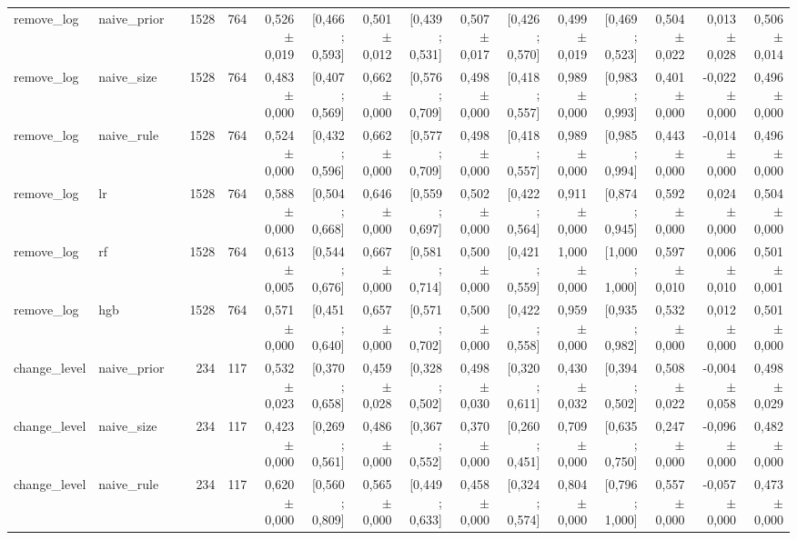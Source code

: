 \begin{table}[htbp]
{\begin{tabular}{llrrrrrrrrrrrrrr}
remove\_log & naive\_prior &  & 1528 & 764 & 0,526 $\pm$ 0,019 & [0,466 ; 0,593] & 0,501 $\pm$ 0,012 & [0,439 ; 0,531] & 0,507 $\pm$ 0,017 & [0,426 ; 0,570] & 0,499 $\pm$ 0,019 & [0,469 ; 0,523] & 0,504 $\pm$ 0,022 & 0,013 $\pm$ 0,028 & 0,506 $\pm$ 0,014 \\
remove\_log & naive\_size &  & 1528 & 764 & 0,483 $\pm$ 0,000 & [0,407 ; 0,569] & 0,662 $\pm$ 0,000 & [0,576 ; 0,709] & 0,498 $\pm$ 0,000 & [0,418 ; 0,557] & 0,989 $\pm$ 0,000 & [0,983 ; 0,993] & 0,401 $\pm$ 0,000 & -0,022 $\pm$ 0,000 & 0,496 $\pm$ 0,000 \\
remove\_log & naive\_rule &  & 1528 & 764 & 0,524 $\pm$ 0,000 & [0,432 ; 0,596] & 0,662 $\pm$ 0,000 & [0,577 ; 0,709] & 0,498 $\pm$ 0,000 & [0,418 ; 0,557] & 0,989 $\pm$ 0,000 & [0,985 ; 0,994] & 0,443 $\pm$ 0,000 & -0,014 $\pm$ 0,000 & 0,496 $\pm$ 0,000 \\
remove\_log & lr &  & 1528 & 764 & 0,588 $\pm$ 0,000 & [0,504 ; 0,668] & 0,646 $\pm$ 0,000 & [0,559 ; 0,697] & 0,502 $\pm$ 0,000 & [0,422 ; 0,564] & 0,911 $\pm$ 0,000 & [0,874 ; 0,945] & 0,592 $\pm$ 0,000 & 0,024 $\pm$ 0,000 & 0,504 $\pm$ 0,000 \\
remove\_log & rf &  & 1528 & 764 & 0,613 $\pm$ 0,005 & [0,544 ; 0,676] & 0,667 $\pm$ 0,000 & [0,581 ; 0,714] & 0,500 $\pm$ 0,000 & [0,421 ; 0,559] & 1,000 $\pm$ 0,000 & [1,000 ; 1,000] & 0,597 $\pm$ 0,010 & 0,006 $\pm$ 0,010 & 0,501 $\pm$ 0,001 \\
remove\_log & hgb &  & 1528 & 764 & 0,571 $\pm$ 0,000 & [0,451 ; 0,640] & 0,657 $\pm$ 0,000 & [0,571 ; 0,702] & 0,500 $\pm$ 0,000 & [0,422 ; 0,558] & 0,959 $\pm$ 0,000 & [0,935 ; 0,982] & 0,532 $\pm$ 0,000 & 0,012 $\pm$ 0,000 & 0,501 $\pm$ 0,000 \\
change\_level & naive\_prior &  & 234 & 117 & 0,532 $\pm$ 0,023 & [0,370 ; 0,658] & 0,459 $\pm$ 0,028 & [0,328 ; 0,502] & 0,498 $\pm$ 0,030 & [0,320 ; 0,611] & 0,430 $\pm$ 0,032 & [0,394 ; 0,502] & 0,508 $\pm$ 0,022 & -0,004 $\pm$ 0,058 & 0,498 $\pm$ 0,029 \\
change\_level & naive\_size &  & 234 & 117 & 0,423 $\pm$ 0,000 & [0,269 ; 0,561] & 0,486 $\pm$ 0,000 & [0,367 ; 0,552] & 0,370 $\pm$ 0,000 & [0,260 ; 0,451] & 0,709 $\pm$ 0,000 & [0,635 ; 0,750] & 0,247 $\pm$ 0,000 & -0,096 $\pm$ 0,000 & 0,482 $\pm$ 0,000 \\
change\_level & naive\_rule &  & 234 & 117 & 0,620 $\pm$ 0,000 & [0,560 ; 0,809] & 0,565 $\pm$ 0,000 & [0,449 ; 0,633] & 0,458 $\pm$ 0,000 & [0,324 ; 0,574] & 0,804 $\pm$ 0,000 & [0,796 ; 1,000] & 0,557 $\pm$ 0,000 & -0,057 $\pm$ 0,000 & 0,473 $\pm$ 0,000 \\

\end{tabular}}
\end{table}
